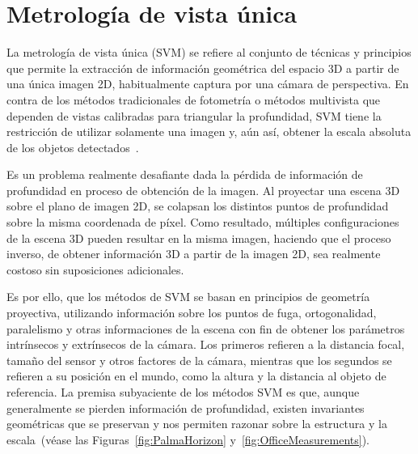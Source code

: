 \section{Metrología de vista única}
La metrología de vista única (SVM) se refiere al conjunto de técnicas y principios que permite la extracción 
de información geométrica del espacio 3D a partir de una única imagen 2D, habitualmente captura por una 
cámara de perspectiva. En contra de los métodos tradicionales de fotometría o métodos multivista que
dependen de vistas calibradas para triangular la profundidad, SVM tiene la restricción de utilizar solamente 
una imagen y, aún así, obtener la escala absoluta de los objetos detectados~\cite{SVMIW}.
\par 
Es un problema realmente desafiante dada la pérdida de información de profundidad en proceso de obtención 
de la imagen. Al proyectar una escena 3D sobre el plano de imagen 2D, se colapsan los distintos puntos de 
profundidad sobre la misma coordenada de píxel. Como resultado, múltiples configuraciones de la escena 3D 
pueden resultar en la misma imagen, haciendo que el proceso inverso, de obtener información 3D a partir de 
la imagen 2D, sea realmente costoso sin suposiciones adicionales.
\par
Es por ello, que los métodos de SVM se basan en principios de geometría proyectiva, utilizando información
sobre los puntos de fuga, ortogonalidad, paralelismo y otras informaciones de la escena con fin de obtener 
los parámetros intrínsecos y extrínsecos de la cámara. Los primeros refieren a la distancia focal, tamaño 
del sensor y otros factores de la cámara, mientras que los segundos se refieren a su posición en el mundo, 
como la altura y la distancia al objeto de referencia. La premisa subyaciente de los métodos SVM es que,
aunque generalmente se pierden información de profundidad, existen invariantes geométricas que se preservan y
nos permiten razonar sobre la estructura y la escala~\cite{VisionBookMIT,Hartley2004}(véase las Figuras~\ref{fig:PalmaHorizon} y~\ref{fig:OfficeMeasurements}).
\par 
